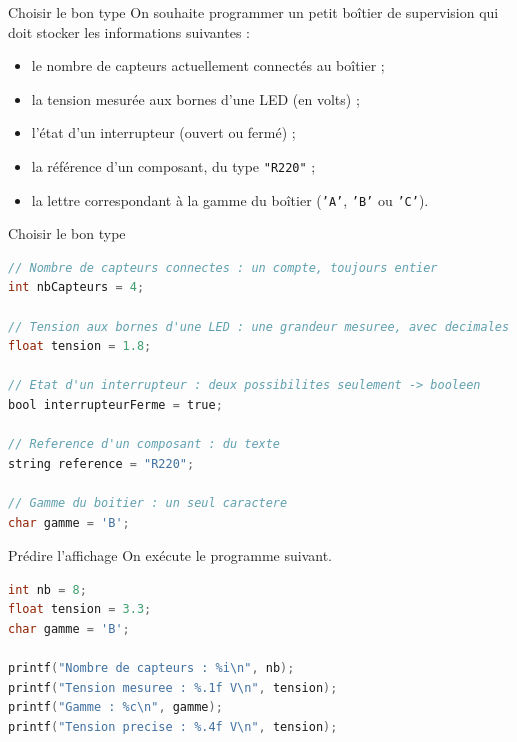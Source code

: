 \begin{UPSTIexercice}{Choisir le bon type}
    On souhaite programmer un petit boîtier de supervision qui doit stocker les informations suivantes :
    \begin{itemize}
        \item le nombre de capteurs actuellement connectés au boîtier ;
        \item la tension mesurée aux bornes d'une LED (en volts) ;
        \item l'état d'un interrupteur (ouvert ou fermé) ;
        \item la référence d'un composant, du type \texttt{"R220"} ;
        \item la lettre correspondant à la gamme du boîtier (\texttt{'A'}, \texttt{'B'} ou \texttt{'C'}).
    \end{itemize}

\end{UPSTIexercice}

\begin{UPSTIprofOnlyEnv}
    \begin{UPSTIcorrectionP}{Choisir le bon type}
        \begin{lstlisting}[language=C]
// Nombre de capteurs connectes : un compte, toujours entier
int nbCapteurs = 4;

// Tension aux bornes d'une LED : une grandeur mesuree, avec decimales
float tension = 1.8;

// Etat d'un interrupteur : deux possibilites seulement -> booleen
bool interrupteurFerme = true;

// Reference d'un composant : du texte
string reference = "R220";

// Gamme du boitier : un seul caractere
char gamme = 'B';
        \end{lstlisting}
    \end{UPSTIcorrectionP}
\end{UPSTIprofOnlyEnv}


\begin{UPSTIexercice}{Prédire l'affichage}
    On exécute le programme suivant.
    \begin{lstlisting}[language=C]
int nb = 8;
float tension = 3.3;
char gamme = 'B';

printf("Nombre de capteurs : %i\n", nb);
printf("Tension mesuree : %.1f V\n", tension);
printf("Gamme : %c\n", gamme);
printf("Tension precise : %.4f V\n", tension);
    \end{lstlisting}
\end{UPSTIexercice}

